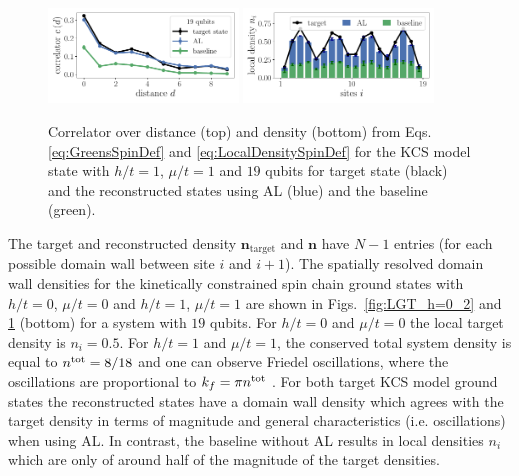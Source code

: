 \documentclass[pra,aps,showpacs,groupedaddress,superscriptaddress,twocolumn,toc=flat,biblatex,footinbib]{revtex4-1}
\renewcommand{\vec}[1]{\bm{#1}}
\begin{document}
\begin{figure}[t]
	\centering
   \includegraphics[width=0.45\textwidth]{Fig8a.pdf}
   \includegraphics[width=0.45\textwidth]{Fig8b.pdf}
	\caption[]{Correlator over distance (top) and density (bottom) from Eqs. \eqref{eq:GreensSpinDef} and \eqref{eq:LocalDensitySpinDef} for the KCS model state with $h/t=1$, $\mu/t=1$ and $19$ qubits for target state (black) and the reconstructed states using AL (blue) and the baseline (green).}
	\label{fig:LGT_h=1_2}
\end{figure}

The target and reconstructed density $\vec{n}_{\mathrm{target}}$ and $\vec{n}$ have $N-1$ entries (for each possible domain wall between site $i$ and $i+1$). The spatially resolved domain wall densities for the kinetically constrained spin chain ground states with $h/t=0$, $\mu/t=0$ and $h/t=1$, $\mu/t=1$ are shown in Figs.~\ref{fig:LGT_h=0_2} and \ref{fig:LGT_h=1_2} (bottom) for a system with $19$ qubits. For $h/t=0$ and $\mu/t=0$ the local target density is $n_i=0.5$. For $h/t=1$ and $\mu/t=1$, the conserved total system density is equal to $n^{\rm tot} = 8 / 18$ and one can observe Friedel oscillations, where the oscillations are proportional to $k_f = \pi n^{\rm tot}$ \cite{Borla2020}. For both target KCS model ground states the reconstructed states have a domain wall density which agrees with the target density in terms of magnitude and general characteristics (i.e. oscillations) when using AL. In contrast, the baseline without AL results in local densities $n_i$ which are only of around half of the magnitude of the target densities. \\
\end{document}
